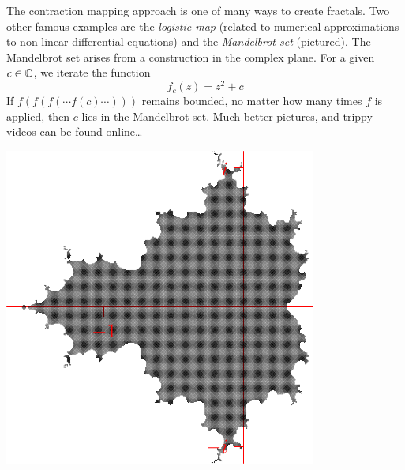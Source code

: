 \begin{minipage}[t]{0.58\linewidth}\vspace{0pt}

The contraction mapping approach is one of many ways to create fractals. Two other famous examples are the \href{https://en.wikipedia.org/wiki/Logistic_map}{\emph{logistic map}} (related to numerical approximations to non-linear differential equations) and the \href{https://en.wikipedia.org/wiki/Mandelbrot_set}{\emph{Mandelbrot set}} (pictured).\smallbreak
The Mandelbrot set arises from a construction in the complex plane. For a given $c\in\mathbb{C}$, we iterate the function
\[f_c(z)=z^2+c\]
If $f(f(f(\cdots f(c)\cdots)))$ remains bounded, no matter how many times $f$ is applied, then $c$ lies in the Mandelbrot set.\smallbreak
Much better pictures, and trippy videos can be found online\ldots
\end{minipage}
\hfill
\begin{minipage}[t]{0.4\linewidth}\vspace{0pt}
\flushright\includegraphics[scale=1]{mandelbrot}
\end{minipage}
\goodbreak



